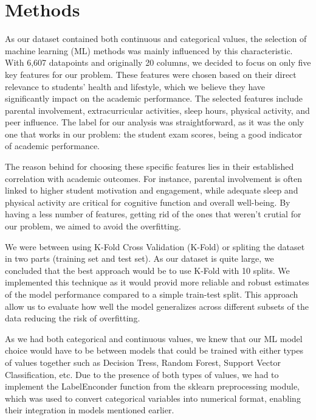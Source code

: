 \documentclass{article}
\begin{document}
\section{Methods}

\quad As our dataset contained both continuous and categorical values, the selection of machine learning (ML) methods was mainly influenced by this characteristic. With 6,607 datapoints and originally 20 columns, we decided to focus on only five key features for our problem. These features were chosen based on their direct relevance to students' health and lifestyle, which we believe they have significantly impact on the academic performance. The selected features include parental involvement, extracurricular activities, sleep hours, physical activity, and peer influence. The label for our analysis was straightforward, as it was the only one that works in our problem: the student exam scores, being a good indicator of academic performance.

The reason behind for choosing these specific features lies in their established correlation with academic outcomes. For instance, parental involvement is often linked to higher student motivation and engagement, while adequate sleep and physical activity are critical for cognitive function and overall well-being. By having a less number of features, getting rid of the ones that weren’t crutial for our problem, we aimed to avoid the overfitting. 

We were between using K-Fold Cross Validation (K-Fold) or spliting the dataset in two parts (training set and test set). As our dataset is quite large, we concluded that the best approach  would be to use K-Fold with 10 splits. We implemented this technique as it would provid more reliable and robust estimates of the model performance compared to a simple train-test split. This approach allow us to evaluate how well the model generalizes across different subsets of the data reducing the risk of overfitting. 

As we had both categorical and continuous values, we knew that our ML model choice would have to be between models that could be trained with either types of values together such as Decision Tress, Random Forest, Support Vector Classification, etc. Due to the presence of both types of values, we had to implement the LabelEnconder function from the sklearn preprocessing module, which was used to convert categorical variables into numerical format, enabling their integration in models mentioned earlier.
\end{document}
